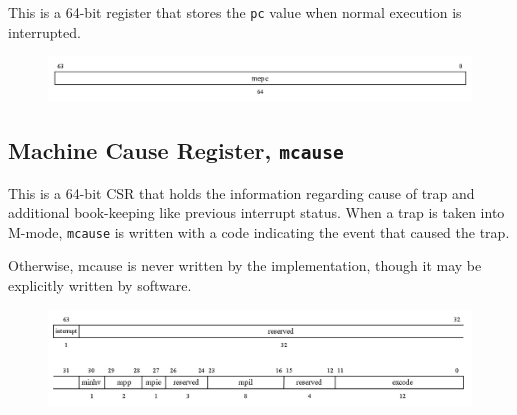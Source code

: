 This is a 64-bit register that stores the \texttt{pc} value when normal execution is interrupted.

\vspace{0.5cm}
\begin{figure}[H]
    \centering
    \includegraphics[width = 15.25cm]{images/csr_mepc.png}
    \label{fig:csr_mepc}
\end{figure}
\vspace{0.25cm}

\subsection{Machine Cause Register, \texttt{mcause}}
\label{subsec:mcause}

This is a 64-bit CSR that holds the information regarding cause of trap and additional book-keeping like previous interrupt status. When a trap is taken into M-mode, \texttt{mcause} is written with a code indicating the event that caused the trap.

Otherwise, mcause is never written by the implementation, though it may be explicitly written by software.

\vspace{0.5cm}
\begin{figure}[H]
    \centering
    \includegraphics[width = 15.25cm]{images/csr_mcause.png}
    \label{fig:csr_mcause}
\end{figure}
\vspace{0.25cm}

